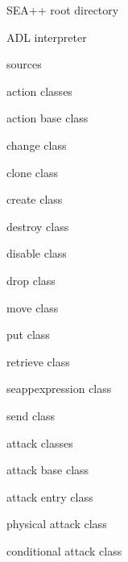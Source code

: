 \begin{description}[noitemsep]
\item[] { SEA++ root directory}
	\item[] { ADL interpreter}
	\item[] { sources}
		\item[] { action classes}
			\item[] { action base class}
			\item[] { change class}
			\item[] { clone class}
			\item[] { create class}
			\item[] { destroy class}
			\item[] { disable class}
			\item[] { drop class}
			\item[] { move class}
			\item[] { put class}
			\item[] { retrieve class}
			\item[] { seappexpression class}
			\item[] { send class}
		\item[] { attack classes}
			\item[] { attack base class}
			\item[] { attack entry class}
			\item[] { physical attack class}
			\item[] { conditional attack class}

\end{description}
